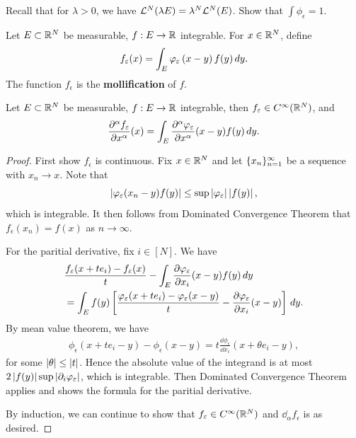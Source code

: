 \documentclass[a4paper]{article}
\begin{document}
\begin{ex}
  Recall that for $\lambda > 0$, we have $\mathcal{L}^N (\lambda E) = \lambda^N
    \mathcal{L}^N (E)$. Show that $\int \phi_\epsilon = 1$.
\end{ex}

\begin{defi}[mollification]
  Let $E \subset \mathbb{R}^N$ be measurable, $f : E \to \mathbb{R}$ integrable. For $x \in
    \mathbb{R}^N$, define
  \[
    f_\varepsilon (x) = \int_E \varphi_\varepsilon \left( x - y \right)
    f (y) \, d y.
  \]
  The function $f_\epsilon$ is the \textbf{mollification} of $f$.
\end{defi}

\begin{thm}
  Let $E \subset \mathbb{R}^N$ be measurable, $f : E \to \mathbb{R}$ integrable, then
  $f_\varepsilon \in C^\infty (\mathbb{R}^N)$, and
  \[
    \frac{\partial^\alpha f_\varepsilon}{\partial x^\alpha} (x)
    = \int_E \frac{\partial^\alpha \varphi_\varepsilon}{\partial x^\alpha} (x - y) f(y) \, d y.
  \]
\end{thm}

\begin{proof}
  First show $f_\epsilon$ is continuous. Fix $x \in \mathbb{R}^N$ and let
  $\{ x_n \}_{n=1}^\infty$ be a sequence with $x_n \to x$. Note that
  \[
    \left\lvert \varphi_\varepsilon (x_n - y) f(y)\right\rvert
    \leq \sup \left\lvert \varphi_\varepsilon\right\rvert \left\lvert f(y)\right\rvert,
  \]
  which is integrable. It then follows from Dominated Convergence Theorem
  that $f_\epsilon (x_n) = f(x)$ as $n \to \infty$.

  For the paritial derivative, fix $i \in [N]$. We have
  \begin{align*}
     & \frac{f_\varepsilon(x + t e_i) - f_\varepsilon (x)}{t}
    - \int_E \frac{\partial \varphi_\varepsilon}{\partial x_i} (x - y) f(y) \, d y                  \\
     & = \int_E f(y) \left[
                       \frac{\varphi_\varepsilon (x + t e_i) - \varphi_\varepsilon (x - y)}{t}
                       - \frac{\partial \varphi_\varepsilon}{\partial x_i} (x - y) \right]
    \, d y.
  \end{align*}
  By mean value theorem, we have
  \begin{align*}
    \phi_\epsilon (x + t e_i - y)
    - \phi_\epsilon (x - y)
    = t \frac{\dd \phi_\epsilon}{\dd x_i} (x + \theta e_i - y),
  \end{align*}
  for some $\left\lvert \theta\right\rvert \leq \left\lvert t\right\rvert$. Hence the absolute value of the
  integrand is at most $2 \left\lvert f(y)\right\rvert \sup \left\lvert \partial_i \varphi_\varepsilon\right\rvert$,
  which is integrable. Then Dominated Convergence Theorem applies and
  shows the formula for the paritial derivative.

  By induction, we can continue to show that $f_\varepsilon \in C^\infty
  (\mathbb{R}^N)$ and $\dd_\alpha f_\epsilon$ is as desired.
\end{proof}
\end{document}
